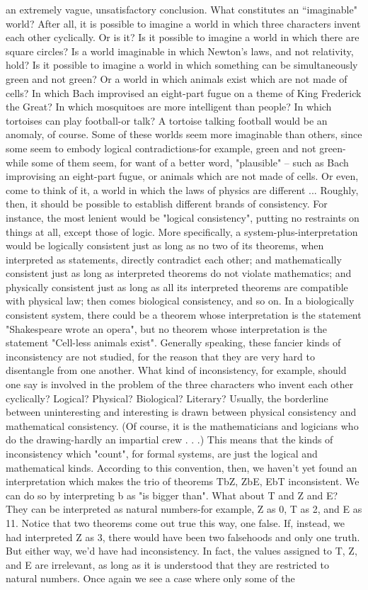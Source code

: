 an extremely vague, unsatisfactory conclusion. What constitutes an “imaginable" world? After all, it is possible to imagine a world in which three characters invent each other cyclically. Or is it? Is it possible to imagine a world in which there are square circles? Is a world imaginable in which Newton's laws, and not relativity, hold? Is it possible to imagine a world in which something can be simultaneously green and not green? Or a world in which animals exist which are not made of cells? In which Bach improvised an eight-part fugue on a theme of King Frederick the Great? In which mosquitoes are more intelligent than people? In which tortoises can play football-or talk? A tortoise talking football would be an anomaly, of course. Some of these worlds seem more imaginable than others, since some seem to embody logical contradictions-for example, green and not green-while some of them seem, for want of a better word, "plausible" -- such as Bach improvising an eight-part fugue, or animals which are not made of cells. Or even, come to think of it, a world in which the laws of physics are different ... Roughly, then, it should be possible to establish different brands of consistency. For instance, the most lenient would be "logical consistency", putting no restraints on things at all, except those of logic. More specifically, a system-plus-interpretation would be logically consistent just as long as no two of its theorems, when interpreted as statements, directly contradict each other; and mathematically consistent just as long as interpreted theorems do not violate mathematics; and physically consistent just as long as all its interpreted theorems are compatible with physical law; then comes biological consistency, and so on. In a biologically consistent system, there could be a theorem whose interpretation is the statement "Shakespeare wrote an opera", but no theorem whose interpretation is the statement "Cell-less animals exist". Generally speaking, these fancier kinds of inconsistency are not studied, for the reason that they are very hard to disentangle from one another. What kind of inconsistency, for example, should one say is involved in the problem of the three characters who invent each other cyclically? Logical? Physical? Biological? Literary? Usually, the borderline between uninteresting and interesting is drawn between physical consistency and mathematical consistency. (Of course, it is the mathematicians and logicians who do the drawing-hardly an impartial crew . . .) This means that the kinds of inconsistency which "count", for formal systems, are just the logical and mathematical kinds. According to this convention, then, we haven't yet found an interpretation which makes the trio of theorems TbZ, ZbE, EbT inconsistent. We can do so by interpreting b as "is bigger than". What about T and Z and E? They can be interpreted as natural numbers-for example, Z as 0, T as 2, and E as 11. Notice that two theorems come out true this way, one false. If, instead, we had interpreted Z as 3, there would have been two falsehoods and only one truth. But either way, we'd have had inconsistency. In fact, the values assigned to T, Z, and E are irrelevant, as long as it is understood that they are restricted to natural numbers. Once again we see a case where only some of the 